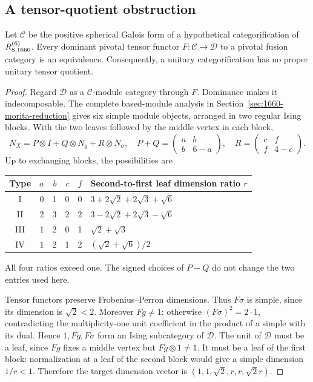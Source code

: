 \subsection{A tensor-quotient obstruction}
\begin{theorem}\label{thm:r1660-pivotal-quotient}
Let $\mathcal C$ be the positive spherical Galois form of a hypothetical categorification of $R^{(6)}_{8,1660}$. Every dominant pivotal tensor functor $F:\mathcal C\to\mathcal D$ to a pivotal fusion category is an equivalence. Consequently, a unitary categorification has no proper unitary tensor quotient.
\end{theorem}
\begin{proof}
Regard $\mathcal D$ as a $\mathcal C$-module category through $F$. Dominance makes it indecomposable. The complete based-module analysis in Section~\ref{sec:1660-morita-reduction} gives six simple module objects, arranged in two regular Ising blocks. With the two leaves followed by the middle vertex in each block,
\[
 N_X=P\otimes I+Q\otimes N_g+R\otimes N_\sigma,\quad
 P+Q=\begin{pmatrix}a&b\\b&6-a\end{pmatrix},\quad
 R=\begin{pmatrix}c&f\\f&4-c\end{pmatrix}.
\]
Up to exchanging blocks, the possibilities are
\begin{center}
\begin{tabular}{c@{\qquad}rrrr@{\qquad}l}
\toprule
Type&$a$&$b$&$c$&$f$&Second-to-first leaf dimension ratio $r$\\
\midrule
I&0&1&0&0&$3+2\sqrt2+2\sqrt3+\sqrt6$\\
II&2&3&2&2&$3-2\sqrt2+2\sqrt3-\sqrt6$\\
III&1&2&0&1&$\sqrt2+\sqrt3$\\
IV&1&2&1&2&$(\sqrt2+\sqrt6)/2$\\
\bottomrule
\end{tabular}
\end{center}
All four ratios exceed one. The signed choices of $P-Q$ do not change the two entries used here.

Tensor functors preserve Frobenius--Perron dimensions. Thus $F\sigma$ is simple, since its dimension is $\sqrt2<2$. Moreover $Fg\ne1$: otherwise $(F\sigma)^2=2\cdot1$, contradicting the multiplicity-one unit coefficient in the product of a simple with its dual. Hence $1,Fg,F\sigma$ form an Ising subcategory of $\mathcal D$. The unit of $\mathcal D$ must be a leaf, since $Fg$ fixes a middle vertex but $Fg\otimes1\ne1$. It must be a leaf of the first block: normalization at a leaf of the second block would give a simple dimension $1/r<1$. Therefore the target dimension vector is $(1,1,\sqrt2,r,r,\sqrt2r)$.


\end{proof}
